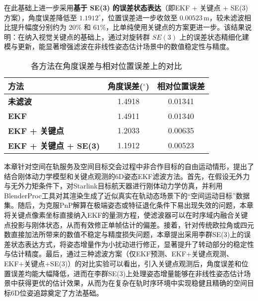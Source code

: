 在此基础上进一步采用\textbf{基于 SE(3) 的误差状态表达}（即EKF + 关键点 + SE(3)方案），角度误差降低至 \(1.1912^\circ\)，位置误差进一步收敛至 \(0.00523\,\mathrm{m}\)，较未滤波相比提升幅度分别约为 \(20\%\) 和 \(61\%\)，比单纯使用关键点的方案更进一步。该结果说明：在纳入视觉关键点的基础上，通过对旋转群 \(SE(3)\) 上的误差状态精细化建模与更新，能显著增强滤波在非线性姿态估计场景中的数值稳定性与精度。
\begin{table}[htbp]
	\centering
	\caption{各方法在角度误差与相对位置误差上的对比}
	\label{tab:filter_compare}
	\begin{tabular}{lcc}
		\toprule
		\textbf{方法} & \textbf{角度误差($^\circ$)} & \textbf{相对位置误差} \\
		\midrule
		\textbf{未滤波} & 1.4918 & 0.01341 \\
		\textbf{EKF} & 1.4911 & 0.01340 \\
		\textbf{EKF + 关键点} & 1.2033 & 0.00635 \\
		\textbf{EKF + 关键点 + SE(3)} & 1.1912 & 0.00523 \\
		\bottomrule
	\end{tabular}
\end{table}
\vspace{5pt}

本章针对空间在轨服务及空间目标交会过程中非合作目标的自由运动情形，提出了结合刚体动力学模型和关键点观测的6D姿态EKF滤波方法。首先，在假设无外力与无外力矩条件下，对Starlink目标航天器进行刚体动力学仿真，并利用BlenderProc工具对其渲染生成了近似真实在轨动态场景下的“空间运动目标”数据集。随后，为克服PnP解算在极端姿态或特征退化条件下易出现失效的问题，本章将关键点像素坐标直接纳入EKF的量测方程，使滤波器可以在时序域内融合关键点投影与刚体状态，从而有效修正单帧估计的偏差。接着，针对传统欧拉角或四元数直接加法所带来的数值不稳定与精度损失问题，本章提出采用李群SE(3)上的误差状态表达方式，将姿态增量作为小扰动进行修正，显著提升了转动部分的稳定性与估计精度。最后，通过三种滤波方案（仅EKF预测、EKF+关键点观测、EKF+关键点+SE(3)）的对比实验可以看出，引入关键点观测后，角度误差和位置误差均能大幅降低，进而在李群SE(3)上处理姿态增量能够在非线性姿态估计场景中获得更优的估计效果，从而为在复杂在轨时序环境中实现稳健且精确的空间目标6D位姿追踪奠定了方法基础。





